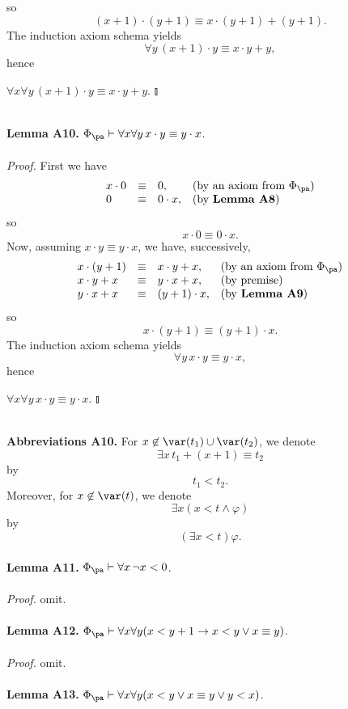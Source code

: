 so
\[
(x + 1) \cdot (y + 1) \equiv x \cdot (y + 1) + (y + 1).
\]
The induction axiom schema yields
\[
\forall y \, (x + 1) \cdot y \equiv x \cdot y + y,
\]
hence
\begin{center}
\phantom{$\talloblong$} \hfill $\forall x \forall y \, (x + 1) \cdot y \equiv x \cdot y + y.$ \hfill $\talloblong$
\end{center}
\ \\
\textbf{Lemma A10.} $\Phi_\pa \vdash \forall x \forall y \, x \cdot y \equiv y \cdot x$.\\
\ \\
\textit{Proof.} First we have
\[
\begin{array}{llll}
x \cdot 0 & \equiv & 0, & \mbox{(by an axiom from $\Phi_\pa$)}\cr
0 & \equiv & 0 \cdot x, & \mbox{(by \textbf{Lemma A8})}
\end{array}
\]
so
\[
x \cdot 0 \equiv 0 \cdot x.
\]
Now, assuming $x \cdot y \equiv y \cdot x$, we have, successively,
\[
\begin{array}{llll}
x \cdot (y + 1) & \equiv & x \cdot y + x, & \mbox{(by an axiom from $\Phi_\pa$)}\cr
x \cdot y + x & \equiv & y \cdot x + x, & \mbox{(by premise)}\cr
y \cdot x + x & \equiv & (y + 1) \cdot x, & \mbox{(by \textbf{Lemma A9})}
\end{array}
\]
so
\[
x \cdot (y + 1) \equiv (y + 1) \cdot x.
\]
The induction axiom schema yields
\[
\forall y \, x \cdot y \equiv y \cdot x,
\]
hence
\begin{center}
\phantom{$\talloblong$} \hfill $\forall x \forall y \, x \cdot y \equiv y \cdot x.$ \hfill $\talloblong$
\end{center}
\ \\
\textbf{Abbreviations A10.} For $x \not\in \var (t_1) \cup \var (t_2)$, we denote
\[
\exists x \, t_1 + (x + 1) \equiv t_2
\]
by
\[
t_1 < t_2.
\]
Moreover, for $x \not\in \var (t)$, we denote
\[
\exists x (x < t \land \varphi )
\]
by
\[
(\exists x < t) \varphi.
\]
\ \\
\textbf{Lemma A11.} $\Phi_\pa \vdash \forall x \, \neg x < 0$.\\
\ \\
\textit{Proof.} omit.\\
\ \\
\textbf{Lemma A12.} $\Phi_\pa \vdash \forall x \forall y (x < y + 1 \rightarrow x < y \lor x \equiv y)$.\\
\ \\
\textit{Proof.} omit.\\
\ \\
\textbf{Lemma A13.} $\Phi_\pa \vdash \forall x \forall y (x < y \lor x \equiv y \lor y < x)$.\\
